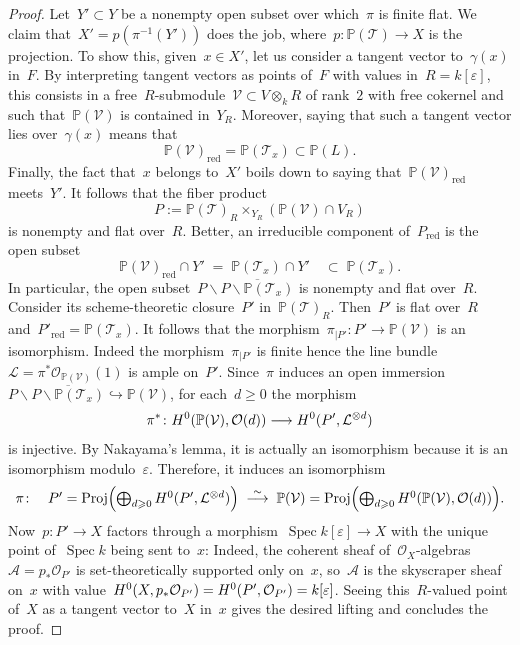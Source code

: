 \documentclass[a4paper]{amsart}
\newcommand{\bbP}{\mathbb{P}}
\newcommand{\cA}{\mathcal{A}}
\newcommand{\cL}{\mathcal{L}}
\newcommand{\cO}{\mathcal{O}}
\newcommand{\cT}{\mathcal{T}}
\newcommand{\cV}{\mathcal{V}}
\newcommand{\rH}{\textup{H}}
\newcommand{\into}{\hookrightarrow}
\newcommand{\too}{\longrightarrow}
\renewcommand{\epsilon}{\varepsilon}
\DeclareMathOperator{\Spec}{Spec}
\DeclareMathOperator{\Proj}{Proj}
\newcommand{\red}{{\mathrm{red}}}
\renewcommand{\ge}{\geqslant}
\theoremstyle{plain}
\theoremstyle{definition}
\numberwithin{equation}{section}
\begin{document}
\begin{proof} 
Let~$Y' \subset Y$ be a nonempty open subset over which~$\pi$ is finite flat. We claim that~$X' = p(\pi^{-1}(Y'))$ does the job, where~$p \colon \bbP(\cT) \to X$ is the projection. To show this, given~$x \in X'$, let us consider a tangent vector to~$\gamma(x)$ in~$F$. By interpreting tangent vectors as points of~$F$ with values in~$R = k[\epsilon]$, this consists in a free~$R$-submodule~$\cV \subset V \otimes_k R$ of rank~$2$ with free cokernel and such that~$\bbP(\cV)$ is contained in~$Y_{R}$. Moreover, saying that such a tangent vector lies over~$\gamma(x)$ means that
\[ \bbP(\cV)_{\red} = \bbP(\cT_x) \subset \bbP(L).\]
Finally, the fact that~$x$ belongs to~$X'$ boils down to saying that~$\bbP(\cV)_{\red}$ meets~$Y'$. It follows that the fiber product
\[ P:= \bbP(\cT)_{R} \times_{Y_{R}} (\bbP(\cV) \cap V_{R}) \]
is nonempty and flat over~$R$. Better, an irreducible component of~$P_{\red}$ is the open subset
\[ \bbP(\cV)_{\red}  \cap Y' \; = \; \bbP(\cT_x) \cap Y' \quad \subset \; \bbP(\cT_x).\]
In particular, the open subset~$P \smallsetminus \overline{P \smallsetminus \bbP(\cT_x)}$ is nonempty and flat over~$R$. Consider its scheme-theoretic closure~$P'$ in~$\bbP(\cT)_{R}$. Then~$P'$ is flat over~$R$ and~$P'_{\red} = \bbP(\cT_x)$. It follows that the morphism~$\pi_{\rvert P'} \colon P' \to \bbP(\cV)$ is an isomorphism. Indeed the morphism~$\pi_{\rvert P'}$ is finite hence the line bundle~$\cL = \pi^\ast \cO_{\bbP(\cV)}(1)$ is ample on~$P'$. Since~$\pi$ induces an open immersion~$P \smallsetminus \overline{P \smallsetminus \bbP(\cT_x)} \into \bbP(\cV)$, for each~$d \ge 0$ the morphism
\[ \pi^\ast \colon \rH^0(\bbP(\cV), \cO(d)) \too \rH^0(P', \cL^{\otimes d})\]
is injective. By Nakayama's lemma, it is actually an isomorphism because it is an isomorphism modulo~$\epsilon$. Therefore, it induces an isomorphism
\[ \pi \textstyle \colon \quad P' = \Proj \Bigl( \bigoplus_{d \ge 0} \rH^0(P', \cL^{\otimes d}) \Bigr) \;  \stackrel{\sim}{\too} \; \bbP(\cV) = \Proj \Bigl( \bigoplus_{d \ge 0} \rH^0(\bbP(\cV), \cO(d)) \Bigr). \]
Now~$p \colon P' \to X$ factors through a morphism~$\Spec k[\epsilon] \to X$ with the unique point of~$\Spec  k$ being sent to~$x$: Indeed, the coherent sheaf of~$\cO_{X}$-algebras~$\cA = p_\ast \cO_{P'}$ is set-theoretically supported only on~$x$, so~$\cA$ is the skyscraper sheaf on~$x$ with value~$\rH^0(X, p_\ast \cO_{P'}) = \rH^0(P', \cO_{P'}) = k[\epsilon]$. Seeing this~$R$-valued point of~$X$ as a tangent vector to~$X$ in~$x$ gives the desired lifting and concludes the proof.
\end{proof}
\end{document}
